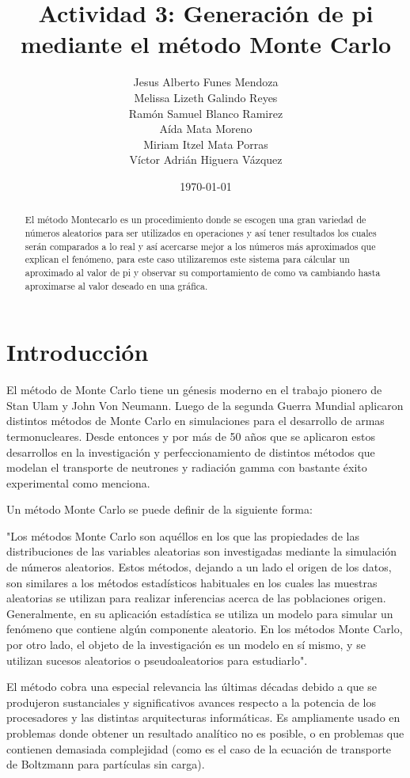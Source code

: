 \documentclass{article}
\author{Jesus Alberto Funes Mendoza  \\
Melissa Lizeth Galindo Reyes  \\
Ramón Samuel Blanco Ramirez  \\
Aída Mata Moreno  \\
Miriam Itzel Mata Porras  \\ 
Víctor Adrián Higuera Vázquez} %
\title{Actividad 3: Generación de pi mediante el método Monte Carlo} %
\date{\today}
\begin{document}

\maketitle %

\begin{abstract} %
El método Montecarlo es un procedimiento donde se escogen una gran variedad de números aleatorios para ser utilizados en operaciones y así tener resultados los cuales serán comparados a lo real y así acercarse mejor a los números más aproximados que explican el fenómeno, para este caso utilizaremos este sistema para cálcular un aproximado al valor de pi y observar su comportamiento de como va cambiando hasta aproximarse al valor deseado en una gráfica.
\end{abstract}

\section{Introducción}\label{intro} %
El método de Monte Carlo tiene un génesis moderno en el trabajo pionero de Stan Ulam y John Von Neumann. Luego de la segunda Guerra Mundial aplicaron distintos métodos de Monte Carlo en simulaciones para el desarrollo de armas termonucleares. Desde entonces y por más de 50 años que se aplicaron estos desarrollos en la investigación y perfeccionamiento de distintos métodos que modelan el transporte de neutrones y radiación gamma con bastante éxito experimental como menciona.

Un método Monte Carlo se puede definir de la siguiente forma:

"Los métodos Monte Carlo son aquéllos en los que las propiedades de las distribuciones de las variables aleatorias son investigadas mediante la simulación de números aleatorios. Estos métodos, dejando a un lado el origen de los datos, son similares a los métodos estadísticos habituales en los cuales las muestras aleatorias se utilizan para realizar inferencias acerca de las poblaciones origen. Generalmente, en su aplicación estadística se utiliza un modelo para simular un fenómeno que contiene algún componente aleatorio. En los métodos Monte Carlo, por otro lado, el objeto de la investigación es un modelo en sí mismo, y se utilizan sucesos aleatorios o pseudoaleatorios para estudiarlo".

El método cobra una especial relevancia las últimas décadas debido a que se produjeron sustanciales y significativos avances respecto a la potencia de los procesadores y las distintas arquitecturas informáticas. Es ampliamente usado en problemas donde obtener un resultado analítico no es posible, o en problemas que contienen demasiada complejidad (como es el caso de la ecuación de transporte de Boltzmann para partículas sin carga)\cite{ff3}.
 
\end{document}
